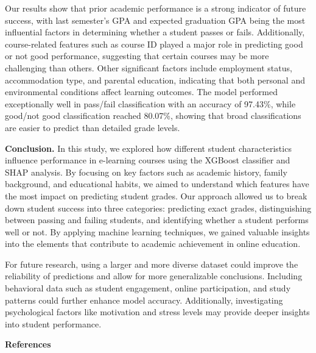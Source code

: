 \begin{multicols}{2}
Our results show that prior academic performance is a strong indicator
of future success, with last semester's GPA and expected graduation GPA
being the most influential factors in determining whether a student
passes or fails. Additionally, course-related features such as course ID
played a major role in predicting good or not good performance,
suggesting that certain courses may be more challenging than others.
Other significant factors include employment status, accommodation type,
and parental education, indicating that both personal and environmental
conditions affect learning outcomes. The model performed exceptionally
well in pass/fail classification with an accuracy of 97.43\%, while
good/not good classification reached 80.07\%, showing that broad
classifications are easier to predict than detailed grade levels.

{\bfseries Conclusion.} In this study, we explored how different student
characteristics influence performance in e-learning courses using the
XGBoost classifier and SHAP analysis. By focusing on key factors such as
academic history, family background, and educational habits, we aimed to
understand which features have the most impact on predicting student
grades. Our approach allowed us to break down student success into three
categories: predicting exact grades, distinguishing between passing and
failing students, and identifying whether a student performs well or
not. By applying machine learning techniques, we gained valuable
insights into the elements that contribute to academic achievement in
online education.

For future research, using a larger and more diverse dataset could
improve the reliability of predictions and allow for more generalizable
conclusions. Including behavioral data such as student engagement,
online participation, and study patterns could further enhance model
accuracy. Additionally, investigating psychological factors like
motivation and stress levels may provide deeper insights into student
performance.
\end{multicols}

\begin{center}
{\bfseries References}
\end{center}

